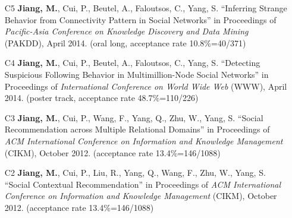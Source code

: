 \documentclass[10pt]{article}
\newenvironment{myindentpar}[1]%
{\begin{list}{}%
         {\setlength{\leftmargin}{#1}}%
         \item[]%
}
{\end{list}}
\newcounter{list}
\begin{document}
\begin{myindentpar}{0.00cm}
\begin{enumerate}[leftmargin=.5cm]
\vspace{-0.1cm}

\item[C5] \textbf{Jiang, M.}, Cui, P., Beutel, A., Faloutsos, C., Yang, S. ``Inferring Strange Behavior from Connectivity Pattern in Social Networks'' in Proceedings of \emph{Pacific-Asia Conference on Knowledge Discovery and Data Mining } (PAKDD), April 2014. (oral long, acceptance rate 10.8\%=40/371)

\vspace{-0.1cm}

\item[C4] \textbf{Jiang, M.}, Cui, P., Beutel, A., Faloutsos, C., Yang, S. ``Detecting Suspicious Following Behavior in Multimillion-Node Social Networks'' in Proceedings of \emph{International Conference on World Wide Web} (WWW), April 2014. (poster track, acceptance rate 48.7\%=110/226)

\vspace{-0.1cm}

\item[C3] \textbf{Jiang, M.}, Cui, P., Wang, F., Yang, Q., Zhu, W., Yang, S. ``Social Recommendation across Multiple Relational Domains'' in Proceedings of \emph{ACM International Conference on Information and Knowledge Management} (CIKM), October 2012. (acceptance rate 13.4\%=146/1088)

\vspace{-0.1cm}

\item[C2] \textbf{Jiang, M.}, Cui, P., Liu, R., Yang, Q., Wang, F., Zhu, W., Yang, S. ``Social Contextual Recommendation'' in Proceedings of \emph{ACM International Conference on Information and Knowledge Management} (CIKM), October 2012. (acceptance rate 13.4\%=146/1088)

\vspace{-0.1cm}


\end{enumerate}
\end{myindentpar}
\end{document}

